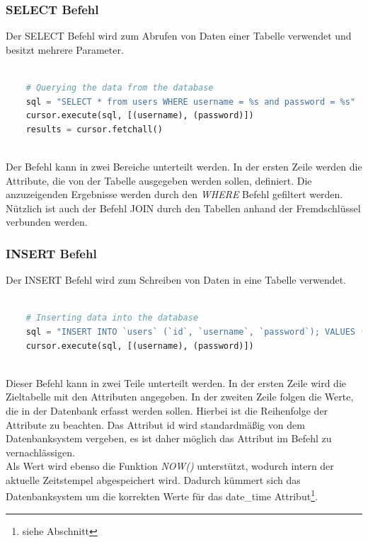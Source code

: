 \subsubsection{SELECT Befehl}

Der SELECT Befehl wird zum Abrufen von Daten einer Tabelle verwendet und besitzt mehrere Parameter.

\begin{lstlisting}[language=Python, caption={SELECT Befehl über MySQL Connector},captionpos=b]
		
	# Querying the data from the database
	sql = "SELECT * from users WHERE username = %s and password = %s"
	cursor.execute(sql, [(username), (password)])
	results = cursor.fetchall()
	
\end{lstlisting}

Der Befehl kann in zwei Bereiche unterteilt werden. In der ersten Zeile werden die
Attribute, die von der Tabelle ausgegeben werden sollen, definiert.  Die anzuzeigenden Ergebnisse werden durch den \textit{WHERE} Befehl gefiltert werden.
\\ Nützlich ist auch der Befehl JOIN durch den Tabellen anhand der Fremdschlüssel verbunden werden.

\subsubsection{INSERT Befehl}

Der INSERT Befehl wird zum Schreiben von Daten in eine Tabelle verwendet.

\begin{lstlisting}[language=Python, caption={INSERT Befehl über MySQL Connector},captionpos=b]
	
	# Inserting data into the database
	sql = "INSERT INTO `users` (`id`, `username`, `password`); VALUES (1, %s, %s);"
	cursor.execute(sql, [(username), (password)])
	
\end{lstlisting}

Dieser Befehl kann in zwei Teile unterteilt werden. In der ersten Zeile wird die Zieltabelle mit den Attributen angegeben. In der zweiten Zeile folgen die Werte, die in der Datenbank erfasst werden sollen. Hierbei ist die Reihenfolge der Attribute zu beachten. Das Attribut id wird standardmäßig von dem Datenbanksystem vergeben, es ist daher möglich das Attribut im Befehl zu vernachlässigen. \\
Als Wert wird ebenso die Funktion \textit{NOW()} unterstützt, wodurch intern der aktuelle Zeitstempel abgespeichert wird. Dadurch kümmert sich das Datenbanksystem um die korrekten Werte für das date\_time Attribut\footnote{siehe Abschnitt }.

\newpage